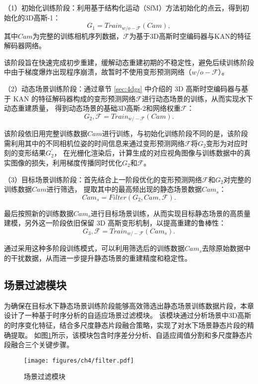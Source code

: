 （1）初始化训练阶段：利用基于结构化运动（SfM）方法\cite{sfm1}\cite{sfm2}初始化的点云，得到初始化的3D高斯-1：
\begin{equation}
    G_1 = Train_{w/o-\mathcal{F} }(Cam),
\end{equation}
其中$Cam$为完整的训练相机序列数据，$\mathcal{F}$为基于3D高斯时空编码器与KAN的特征解码器网络。

该阶段旨在快速完成初步重建，缓解动态重建初期的不稳定性，避免后续训练阶段中由于梯度爆炸出现程序崩溃，故暂时不使用变形预测网络（$w/o-\mathcal{F}$）。

（2）动态场景训练阶段：通过章节 \ref{sec:4dgs} 中介绍的 3D 高斯时空编码器与基于 KAN 的特征解码器构成的变形预测网络$\mathcal{F}$进行动态场景的训练，从而实现水下动态重建质量，
得到动态场景的基础3D高斯-2和网络权重$\mathcal{F}$：
\begin{equation}
    G_2, \mathcal{F} = Train_{w/-\mathcal{F} }(Cam).
\end{equation}

该阶段依旧用完整训练数据$Cam$进行训练，与初始化训练阶段不同的是，该阶段需利用其中的不同相机位姿的时间信息来通过变形预测网络$\mathcal{F}$将$G_2$变形为对应时刻的变形结果$G_2^\prime$，
在光栅化渲染后，计算生成的对应视角图像与训练数据中的真实图像的损失，利用梯度传播同时优化$G_2$和$\mathcal{F}$。

（3）目标场景训练阶段：首先结合上一阶段优化的变形预测网络$\mathcal{F}$和$G_2$对完整的训练数据$Cam$进行筛选，
提取其中的最高频出现的静态场景数据$Cam_s$：
\begin{equation}
  Cam_s = Filter(G_2, Cam, \mathcal{F}).
\end{equation}

最后按照新的训练数据$Cam_s$进行目标场景训练，从而实现目标静态场景的高质量建模，另外这一阶段依旧保留 3D 高斯变形机制，以提高重建的鲁棒性：
\begin{equation}
    G_3, \mathcal{F} = Train_{w/-\mathcal{F} }(Cam_s).
\end{equation}

通过采用这种多阶段训练模式，可以利用筛选后的训练数据$Cam_s$去除原始数据中的干扰数据，从而进一步提升静态场景的重建精度和稳定性。

\subsection{场景过滤模块}
为确保在目标水下静态场景训练阶段能够高效筛选出静态场景训练数据片段，本章设计了一种基于时序分析的自适应场景过滤模块。
该模块通过分析场景中3D高斯的时序变化特征，结合多尺度静态片段融合策略，实现了对水下场景静态片段的精确提取。
如图\ref{img:filter}所示，该模块包含时序差分分析、自适应阈值分割和多尺度静态片段融合三个关键步骤。
\begin{figure}[htbp]
    \vspace{4mm}
    \centering
    \texttt{[image: figures/ch4/filter.pdf]}
    \caption{场景过滤模块}
    \label{img:filter}
\end{figure}

